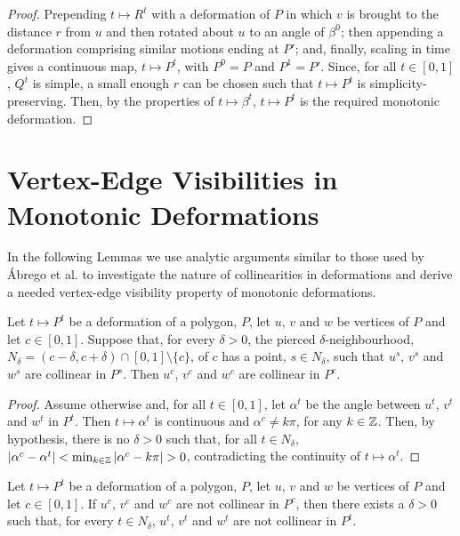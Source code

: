 \documentclass[11pt]{amsart}
\begin{document}
\begin{proof}
  Prepending $t\mapsto R^t$ with a deformation of $P$ in which $v$ is
  brought to the distance $r$ from $u$ and then rotated about $u$ to
  an angle of $\beta^0$; then appending a deformation comprising
  similar motions ending at $P'$; and, finally, scaling in time gives
  a continuous map, $t\mapsto P^t$, with $P^0 = P$ and $P^1 = P'$.
  Since, for all $t\in[0,1]$, $Q^t$ is simple, a small enough $r$ can
  be chosen such that $t\mapsto P^t$ is simplicity-preserving.  Then,
  by the properties of $t\mapsto \beta^t$, $t\mapsto P^t$ is the
  required monotonic deformation.
\end{proof}



\section{Vertex-Edge Visibilities in Monotonic Deformations}

In the following Lemmas we use analytic arguments similar to those
used by {\'A}brego et al. \cite{Abrego11} to investigate the nature of
collinearities in deformations and derive a needed vertex-edge
visibility property of monotonic deformations.

\begin{lemma}
  Let $t\mapsto P^t$ be a deformation of a polygon, $P$, let $u$, $v$
  and $w$ be vertices of $P$ and let $c\in[0,1]$.  Suppose that, for
  every $\delta>0$, the pierced $\delta$-neighbourhood, $N_\delta =
  (c-\delta, c+\delta)\cap [0,1]\setminus \{c\}$, of $c$ has a point,
  $s\in N_\delta$, such that $u^s$, $v^s$ and $w^s$ are collinear in
  $P^s$.  Then $u^c$, $v^c$ and $w^c$ are collinear in $P^c$.
\end{lemma}
\begin{proof}
  Assume otherwise and, for all $t\in[0,1]$, let $\alpha^t$ be the
  angle between $u^t$, $v^t$ and $w^t$ in $P^t$.  Then $t\mapsto
  \alpha^t$ is continuous and $\alpha^c\neq k\pi$, for any $k\in\mathbb{Z}$.
  Then, by hypothesis, there is no $\delta>0$ such that, for all $t\in
  N_\delta$, $|\alpha^c - \alpha^t| < \min_{k\in\mathbb{Z}}|\alpha^c-k\pi| >
  0$, contradicting the continuity of $t\mapsto \alpha^t$.
\end{proof}

\begin{corollary}
  Let $t\mapsto P^t$ be a deformation of a polygon, $P$, let $u$, $v$
  and $w$ be vertices of $P$ and let $c\in[0,1]$.  If $u^c$, $v^c$ and
  $w^c$ are not collinear in $P^c$, then there exists a $\delta>0$
  such that, for every $t\in N_\delta$, $u^t$, $v^t$ and $w^t$ are not
  collinear in $P^t$.
\end{corollary}
\end{document}
